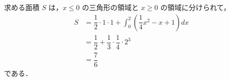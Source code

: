 \documentclass[../../main.tex]{subfiles}
\begin{document}
求める面積 $S$ は，$x\le 0$ の三角形の領域と $x \ge 0$ の領域に分けられて，
\begin{align}
  S &= \dfrac{1}{2} \cdot 1 \cdot 1 + \int_0^2 \left(\dfrac{1}{4}x^2 - x + 1\right) dx \\
  &= \dfrac{1}{2} + \dfrac{1}{3} \cdot \dfrac{1}{4} \cdot 2^3 \\
  &= \dfrac{7}{6}
\end{align}
である．
\end{document}
